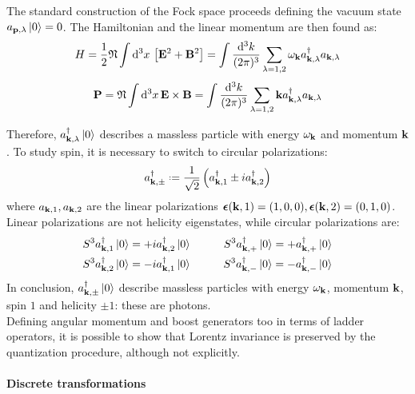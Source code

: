 The standard construction of the Fock space proceeds defining the vacuum state $ a_{\mathbf{p},\lambda} \ket{0} = 0 $. The Hamiltonian and the linear momentum are then found as:
\begin{equation}
  H = \frac{1}{2} \mathfrak{N} \int \mathrm{d}^3x\, \left[ \mathbf{E}^2 + \mathbf{B}^2 \right] = \int \frac{\mathrm{d}^3k}{(2\pi)^3} \sum_{\lambda = 1,2} \omega_{\mathbf{k}} a_{\mathbf{k},\lambda}^\dagger a_{\mathbf{k},\lambda}
\end{equation}
\begin{equation}
  \mathbf{P} = \mathfrak{N} \int \mathrm{d}^3x\, \mathbf{E} \times \mathbf{B} = \int \frac{\mathrm{d}^3k}{(2\pi)^3} \sum_{\lambda = 1,2} \mathbf{k} a_{\mathbf{k},\lambda}^\dagger a_{\mathbf{k},\lambda}
\end{equation}

Therefore, $ a_{\mathbf{k},\lambda}^\dagger \ket{0} $ describes a massless particle with energy $ \omega_{\mathbf{k}} $ and momentum $ \mathbf{k} $. To study spin, it is necessary to switch to circular polarizations:
\begin{equation}
  a_{\ve{k},\pm}\dg \defeq \frac{1}{\sqrt{2}} \left( a_{\ve{k},1}\dg \pm i a_{\ve{k},2}\dg \right)
\end{equation}
where $ a_{\mathbf{k},1} , a_{\mathbf{k},2} $ are the linear polarizations $ \boldsymbol{\epsilon}(\mathbf{k},1) = (1,0,0) , \boldsymbol{\epsilon}(\mathbf{k},2) = (0,1,0) $. Linear polarizations are not helicity eigenstates, while circular polarizations are:
\begin{align*}
  S^3 a_{\mathbf{k},1}^\dagger \ket{0} = + i a_{\mathbf{k},2}^\dagger \ket{0} & \qquad & S^3 a_{\mathbf{k},+}^\dagger \ket{0} = + a_{\mathbf{k},+}^\dagger \ket{0} \\
  S^3 a_{\mathbf{k},2}^\dagger \ket{0} = - i a_{\mathbf{k},1}^\dagger \ket{0} & \qquad & S^3 a_{\mathbf{k},-}^\dagger \ket{0} = - a_{\mathbf{k},-}^\dagger \ket{0}
\end{align*}
In conclusion, $ a_{\mathbf{k},\pm}^\dagger \ket{0} $ describe massless particles with energy $ \omega_{\mathbf{k}} $, momentum $ \mathbf{k} $, spin $ 1 $ and helicity $ \pm 1 $: these are photons. \\
Defining angular momentum and boost generators too in terms of ladder operators, it is possible to show that Lorentz invariance is preserved by the quantization procedure, although not explicitly.

\paragraph{Discrete transformations}

